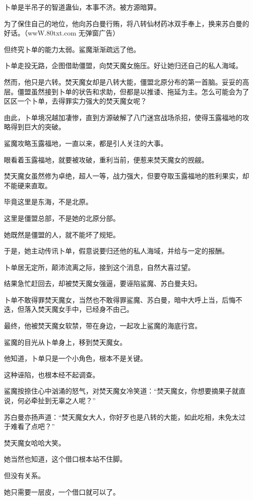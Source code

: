\begin{this_body}
卜单是半吊子的智道蛊仙，本事不济。被方源暗算。

为了保住自己的地位，他向苏白曼行贿，将八转仙材药冰双手奉上，换来苏白曼的好话。（wwW.80txt.com 无弹窗广告）

但终究卜单的能力太弱。鲨魔渐渐疏远了他。

卜单走投无路，企图借助僵盟，向焚天魔女施压。好让她归还自己的私人海域。

然而，他只是六转。焚天魔女却是八转大能，僵盟北原分布的第一首脑。妥妥的高层。僵盟虽然接到卜单的状告和求助，但都是以推诿、拖延为主。怎么可能会为了区区一个卜单，去得罪实力强大的焚天魔女呢？

由此，卜单境况越加凄惨，直到方源破解了八门迷宫战场杀招，使得玉露福地的攻略得到巨大的突破。

鲨魔攻略玉露福地，一直以来，都是引人关注的大事。

眼看着玉露福地，就要被攻破，重利当前，便惹来焚天魔女的觊觎。

焚天魔女虽然修为卓绝，超人一等，战力强大，但要夺取玉露福地的胜利果实，却不能硬来直取。

毕竟这里是东海，不是北原。

这里是僵盟总部，不是她的北原分部。

她既然是僵盟的人，就不能坏了规矩。

于是，她主动传讯卜单，假意说要归还他的私人海域，并给与一定的报酬。

卜单居无定所，颠沛流离之际，接到这个消息，自然大喜过望。

结果急忙赶回去，却被焚天魔女强逼，要诬陷鲨魔、苏白曼夫妇。

卜单不敢得罪焚天魔女，当然也不敢得罪鲨魔、苏白曼，暗中大呼上当，后悔不迭，但落入焚天魔女手中，已经身不由己。

最终，他被焚天魔女软禁，带在身边，一起攻上鲨魔的海底行宫。

鲨魔的目光从卜单身上，移到焚天魔女。

他知道，卜单只是一个小角色，根本不是关键。

这种诬陷，也根本经不起调查。

鲨魔按捺住心中汹涌的怒气，对焚天魔女冷笑道：“焚天魔女，你想要摘果子就直说，何必牵扯到无辜之人呢？”

苏白曼亦扬声道：“焚天魔女大人，你好歹也是八转的大能，如此吃相，未免太过于难看了点吧？”

焚天魔女哈哈大笑。

她当然也知道，这个借口根本站不住脚。

但没有关系。

她只需要一层皮，一个借口就可以了。


\end{this_body}
